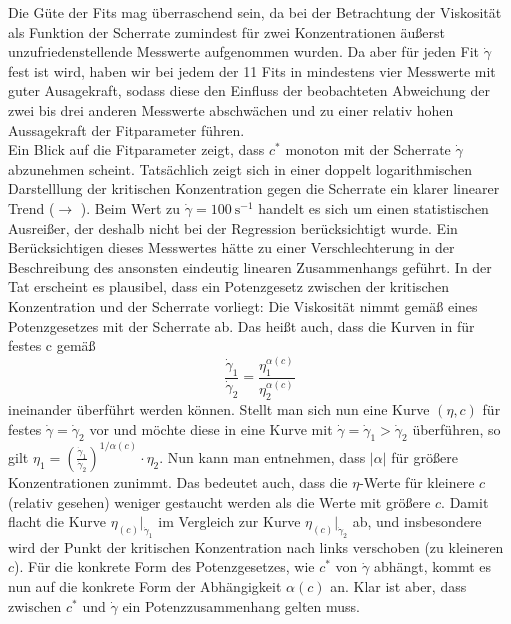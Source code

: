 \documentclass[11pt,a4paper,oneside]{scrartcl}
\begin{document}
Die Güte der Fits mag überraschend sein, da bei der Betrachtung der Viskosität als Funktion der Scherrate zumindest für zwei Konzentrationen äußerst unzufriedenstellende Messwerte aufgenommen wurden. Da aber für jeden Fit $\dot\gamma$ fest ist wird, haben wir bei jedem der 11 Fits in  mindestens vier Messwerte mit guter Ausagekraft, sodass diese den Einfluss der beobachteten Abweichung der zwei bis drei anderen Messwerte abschwächen und zu einer relativ hohen Aussagekraft der Fitparameter führen.\\
Ein Blick auf die Fitparameter zeigt, dass $c^*$ monoton mit der Scherrate $\dot\gamma$ abzunehmen scheint. Tatsächlich zeigt sich in einer doppelt logarithmischen Darstelllung der kritischen Konzentration gegen die Scherrate ein klarer linearer Trend ($\rightarrow$ ). Beim Wert zu $\dot\gamma=100\ \mathrm s^{-1}$ handelt es sich um einen statistischen Ausreißer, der deshalb nicht bei der Regression berücksichtigt wurde. Ein Berücksichtigen dieses Messwertes hätte zu einer Verschlechterung in der Beschreibung des ansonsten eindeutig linearen Zusammenhangs geführt.
In der Tat erscheint es plausibel, dass ein Potenzgesetz zwischen der kritischen Konzentration und der Scherrate vorliegt: Die Viskosität nimmt gemäß eines Potenzgesetzes mit der Scherrate ab. 
Das heißt auch, dass die Kurven in  für festes c gemäß \begin{equation}
\frac{\dot\gamma_1}{\dot\gamma_2}=\frac{\eta_1^{\alpha(c)}}{\eta_2^{\alpha(c)}}
\end{equation}
ineinander überführt werden können. Stellt man sich nun eine Kurve $(\eta,c)$ für festes $\dot\gamma=\dot\gamma_2$ vor und möchte diese in eine Kurve mit $\dot\gamma=\dot\gamma_1>\dot\gamma_2$ überführen, so gilt $\eta_1=\left(\frac{\dot\gamma_1}{\dot\gamma_2}\right)^{1/\alpha(c)}\cdot\eta_2$. Nun kann man  entnehmen, dass $|\alpha|$ für größere Konzentrationen zunimmt. Das bedeutet auch, dass die $\eta$-Werte für kleinere $c$ (relativ gesehen) weniger gestaucht werden als die Werte mit größere $c$. Damit flacht die Kurve $\eta_(c)\big|_{\dot\gamma_1}$ im Vergleich zur Kurve 
$\eta_(c)\big|_{\dot\gamma_2}$ ab, und insbesondere wird der Punkt der kritischen Konzentration nach links verschoben (zu kleineren $c$). Für die konkrete Form des Potenzgesetzes, wie $c^*$ von $\dot\gamma$ abhängt, kommt es nun auf die konkrete Form der Abhängigkeit $\alpha(c)$ an. Klar ist aber, dass zwischen $c^*$ und $\dot\gamma$ ein Potenzzusammenhang gelten muss.\par
\end{document}
